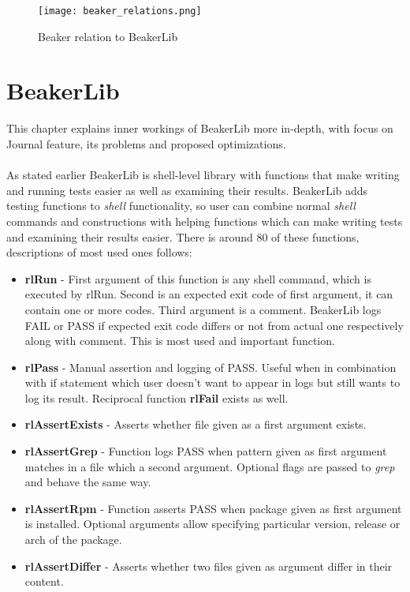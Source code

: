 \begin{figure}[h!]
  \texttt{[image: beaker\_relations.png]}
  \caption{Beaker relation to BeakerLib}
  \label{fig:beaker_relation}
\end{figure}




\chapter{BeakerLib}
This chapter explains inner workings of BeakerLib more in-depth, with focus on Journal feature, its problems and proposed optimizations.
\\
\\
As stated earlier BeakerLib is shell-level library with functions that make writing and running tests easier as well as examining their results.
BeakerLib adds testing functions to \textit{shell} functionality, so user can combine normal \textit{shell} commands and constructions with helping functions which can make writing tests and examining their results easier. There is around 80 of these functions, descriptions of most used ones follows:
\begin{itemize}
\item \textbf{rlRun} - First argument of this function is any shell command, which is executed by rlRun. Second is an expected exit code of first argument, it can contain one or more codes. Third argument is a comment. BeakerLib logs FAIL or PASS if expected exit code differs or not from actual one respectively along with comment. This is most used and important function.
\item \textbf{rlPass} - Manual assertion and logging of PASS. Useful when in combination with if statement which user doesn't want to appear in logs but still wants to log its result. Reciprocal function \textbf{rlFail} exists as well.
\item \textbf{rlAssertExists} - Asserts whether file given as a first argument exists.
\item \textbf{rlAssertGrep} - Function logs PASS when pattern given as first argument matches in a file which a second argument. Optional flags are passed to \textit{grep} and behave the same way.
\item \textbf{rlAssertRpm} - Function asserts PASS when package given as first argument is installed.  Optional arguments allow specifying particular version, release or arch of the package.
\item \textbf{rlAssertDiffer} - Asserts whether two files given as argument differ in their content. 
\end{itemize}
